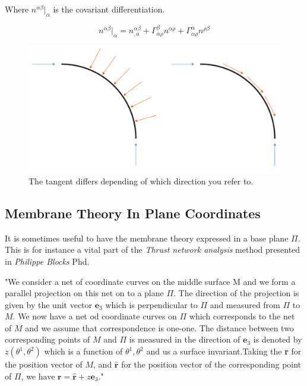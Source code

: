 Where $n^{\alpha \beta}|_\alpha$ is the covariant differentiation. 

\begin{equation}
n^{\alpha \beta}|_\alpha = n^{\alpha \beta}_{,a} + \Gamma^\beta_{\alpha \rho} n^{\alpha \rho} + \Gamma^\alpha_{\alpha \rho} n^{\rho \beta}
\end{equation}


\begin{figure}[H]
\centering
\includegraphics[width=0.9\linewidth ]{figure/Theory/equlibriumMem.pdf}
\caption{The tangent differs depending of which direction you refer to. }
\end{figure}

\subsection{Membrane Theory In Plane Coordinates}
It is sometimes useful to have the membrane theory expressed in a base plane $\Pi$. This is for instance a vital part of the \textit{Thrust network analysis} method presented in \textit{Philippe Blocks} Phd.

"We consider a net of coordinate curves on the middle surface M and we form a parallel projection on this net on to a plane $\Pi$. The direction of the projection is given by the unit vector $\textbf{e}_3$ which is perpendicular to $\Pi$ and measured from $\Pi$ to $M$. We now have a net od coordinate curves on $\Pi$ which corresponds to the net of $M$ and we assume that correspondence is one-one. The distance between two corresponding points of  $M$ and $\Pi$ is measured in the direction of $\textbf{e}_3$ is denoted by $z(\theta^1, \theta^2)$ which is a function of $\theta^1,\theta^2$ and us a surface invariant.Taking the \textbf{r} for the position vector of $M$, and $\hat{\textbf{r}}$ for the position vector of the corresponding point of $\Pi$, we have $\textbf{r} = \hat{\textbf{r}} + z \textbf{e}_3$."

